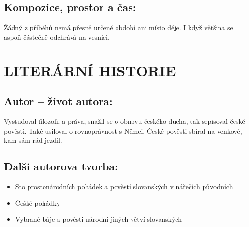 \documentclass[A4paper]{extarticle} %
\begin{document}
\subsection*{Kompozice, prostor a čas:}
\noindent 
Žádný z příběhů nemá přesně určené období ani místo děje. I když většina se aspoň částečně odehrává na vesnici.


\section*{LITERÁRNÍ HISTORIE}





\subsection*{Autor {\ssmall -- život autora:}}
\noindent 
Vystudoval filozofii a práva, snažil se o obnovu českého ducha, tak sepisoval české pověsti. Také usiloval o rovnoprávnost s Němci. České pověsti sbíral na venkově, kam sám rád jezdil.


\subsection*{Další autorova tvorba:}
\noindent 
\begin{itemize}
    \item Sto prostonárodních pohádek a pověstí slovanských v nářečích původních
    \item Češké pohádky
    \item Vybrané báje a pověsti národní jiných větví slovanských
\end{itemize}
\end{document}
